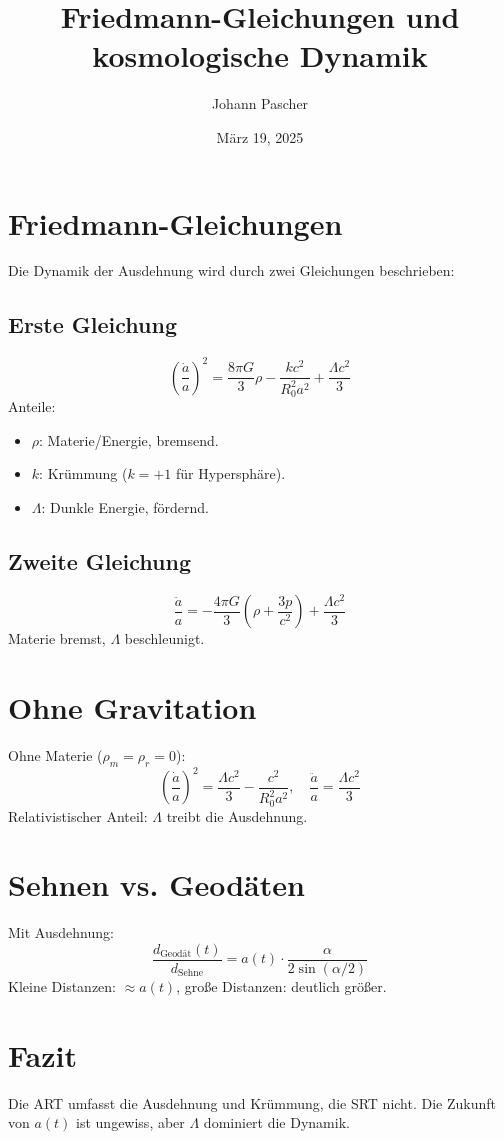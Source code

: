 \documentclass[a4paper,12pt]{article}
\title{Friedmann-Gleichungen und kosmologische Dynamik}
\author{Johann Pascher}
\date{März 19, 2025}
\begin{document}
	
	\maketitle
	
	\section{Friedmann-Gleichungen}
	Die Dynamik der Ausdehnung wird durch zwei Gleichungen beschrieben:
	
	\subsection{Erste Gleichung}
	\[
	\left(\frac{\dot{a}}{a}\right)^2 = \frac{8\pi G}{3} \rho - \frac{k c^2}{R_0^2 a^2} + \frac{\Lambda c^2}{3}
	\]
	Anteile:
	\begin{itemize}
		\item \(\rho\): Materie/Energie, bremsend.
		\item \(k\): Krümmung (\(k = +1\) für Hypersphäre).
		\item \(\Lambda\): Dunkle Energie, fördernd.
	\end{itemize}
	
	\subsection{Zweite Gleichung}
	\[
	\frac{\ddot{a}}{a} = -\frac{4\pi G}{3} \left(\rho + \frac{3p}{c^2}\right) + \frac{\Lambda c^2}{3}
	\]
	Materie bremst, \(\Lambda\) beschleunigt.
	
	\section{Ohne Gravitation}
	Ohne Materie (\(\rho_m = \rho_r = 0\)):
	\[
	\left(\frac{\dot{a}}{a}\right)^2 = \frac{\Lambda c^2}{3} - \frac{c^2}{R_0^2 a^2}, \quad \frac{\ddot{a}}{a} = \frac{\Lambda c^2}{3}
	\]
	Relativistischer Anteil: \(\Lambda\) treibt die Ausdehnung.
	
	\section{Sehnen vs. Geodäten}
	Mit Ausdehnung:
	\[
	\frac{d_{\text{Geodät}}(t)}{d_{\text{Sehne}}} = a(t) \cdot \frac{\alpha}{2 \sin(\alpha/2)}
	\]
	Kleine Distanzen: \(\approx a(t)\), große Distanzen: deutlich größer.
	
	\section{Fazit}
	Die ART umfasst die Ausdehnung und Krümmung, die SRT nicht. Die Zukunft von \(a(t)\) ist ungewiss, aber \(\Lambda\) dominiert die Dynamik.
	
\end{document}
